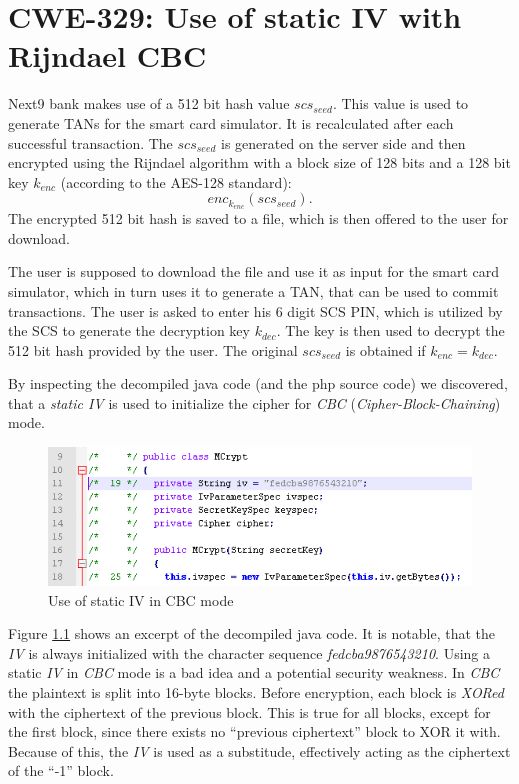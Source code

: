 \chapter{CWE-329: Use of static IV with Rijndael CBC}
\label{chapter:static_iv}

Next9 bank makes use of a 512 bit hash value $scs_{seed}$. This value is used to generate TANs for the smart card simulator. It is recalculated after each successful transaction. The $scs_{seed}$ is generated on the server side and then encrypted using the Rijndael algorithm with a block size of 128 bits and a 128 bit key $k_{enc}$ (according to the AES-128 standard): $$enc_{k_{enc}} (scs_{seed}).$$
The encrypted 512 bit hash is saved to a file, which is then offered to the user for download. 

The user is supposed to download the file and use it as input for the smart card simulator, which in turn uses it to generate a TAN, that can be used to commit transactions. The user is asked to enter his 6 digit SCS PIN, which is utilized by the SCS to generate the decryption key $k_{dec}$. The key is then used to decrypt the 512 bit hash provided by the user. The original $scs_{seed}$ is obtained if $k_{enc} = k_{dec}$.

By inspecting the decompiled java code (and the php source code) we discovered, that a \emph{static IV} is used to initialize the cipher for \emph{CBC} (\emph{Cipher-Block-Chaining}) mode.
\begin{center}
\begin{figure}[hbtp]
        \centering
        \includegraphics[natwidth=162bp,natheight=227bp]{staticIV.png}
        \caption{Use of static IV in CBC mode}\label{figStaticIV}
\end{figure}
\end{center}

Figure \ref{figStaticIV} shows an excerpt of the decompiled java code. It is notable, that the \emph{IV} is always initialized with the character sequence \emph{fedcba9876543210}. Using a static \emph{IV} in \emph{CBC} mode is a bad idea and a potential security weakness. In \emph{CBC} the plaintext is split into 16-byte blocks. Before encryption, each block is \emph{XORed} with the ciphertext of the previous block. This is true for all blocks, except for the first block, since there exists no ``previous ciphertext'' block to XOR it with. Because of this, the \emph{IV} is used as a substitude, effectively acting as the ciphertext of the ``-1'' block.

